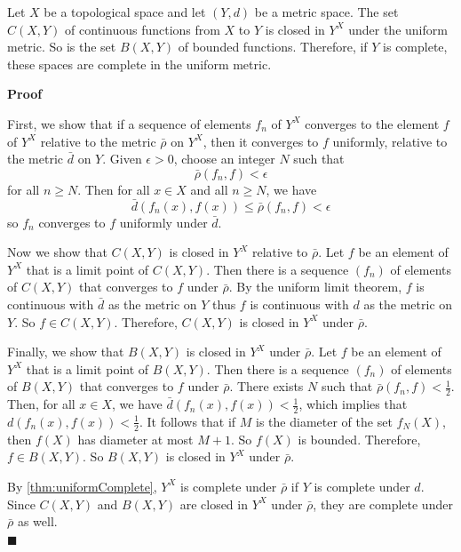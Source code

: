 \documentclass[main.tex]{subfiles}
\begin{document}
\begin{theorem}
    \label{thm:completeFunSpace}
    Let $X$ be a topological space and let $(Y, d)$ be a metric space. The set $C(X, Y)$ of continuous functions from $X$ to $Y$ is closed in $Y^X$ under the uniform metric. So is the set $B(X, Y)$ of bounded functions. Therefore, if $Y$ is complete, these spaces are complete in the uniform metric. 
\end{theorem}
\par \noindent \textbf{Proof} 
\par First, we show that if a sequence of elements $f_n$ of $Y^X$ converges to the element $f$ of $Y^X$ relative to the metric $\bar{\rho}$ on $Y^X$, then it converges to $f$ uniformly, relative to the metric $\bar{d}$ on $Y$. Given $\epsilon > 0$, choose an integer $N$ such that 
\begin{equation}
    \bar{\rho}(f_n, f) < \epsilon
\end{equation}
for all $n \geq N$. Then for all $x \in X$ and all $n \geq N$, we have 
\begin{equation}
    \bar{d}(f_n(x), f(x)) \leq \bar{\rho}(f_n, f) < \epsilon
\end{equation}
so $f_n$ converges to $f$ uniformly under $\bar{d}$. 
\par Now we show that $C(X, Y)$ is closed in $Y^X$ relative to $\bar{\rho}$. Let $f$ be an element of $Y^X$ that is a limit point of $C(X, Y)$. Then there is a sequence $(f_n)$ of elements of $C(X, Y)$ that converges to $f$ under $\bar{\rho}$. By the uniform limit theorem, $f$ is continuous with $\bar{d}$ as the metric on $Y$ thus $f$ is continuous with $d$ as the metric on $Y$. So $f \in C(X, Y)$. Therefore, $C(X, Y)$ is closed in $Y^X$ under $\bar{\rho}$. 
\par Finally, we show that $B(X, Y)$ is closed in $Y^X$ under $\bar{\rho}$. Let $f$ be an element of $Y^X$ that is a limit point of $B(X, Y)$. Then there is a sequence $(f_n)$ of elements of $B(X, Y)$ that converges to $f$ under $\bar{\rho}$. There exists $N$ such that $\bar{\rho}(f_n, f) < \frac{1}{2}$. Then, for all $x \in X$, we have $\bar{d}(f_n(x), f(x)) < \frac{1}{2}$, which implies that $d(f_n(x), f(x)) < \frac{1}{2}$. It follows that if $M$ is the diameter of the set $f_N(X)$, then $f(X)$ has diameter at most $M + 1$. So $f(X)$ is bounded. Therefore, $f \in B(X, Y)$. So $B(X, Y)$ is closed in $Y^X$ under $\bar{\rho}$. 
\par By \ref{thm:uniformComplete}, $Y^X$ is complete under $\bar{\rho}$ if $Y$ is complete under $d$. Since $C(X, Y)$ and $B(X, Y)$ are closed in $Y^X$ under $\bar{\rho}$, they are complete under $\bar{\rho}$ as well. 
\mbox{} \\ \null \hfill $\blacksquare$ 
 
\end{document}
